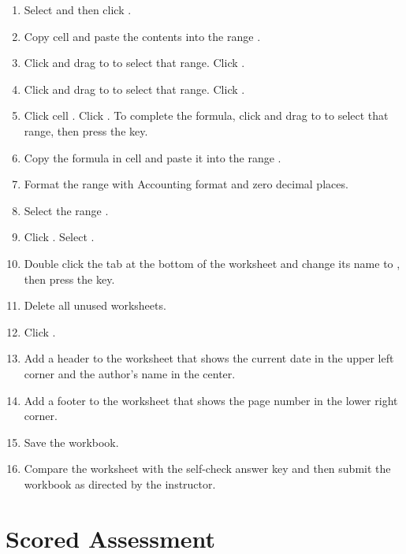\begin{enumerate}[resume]
	\item Select  and then click . 
	\item Copy cell  and paste the contents into the range .
	\item Click  and drag to  to select that range. Click .
	\item Click  and drag to  to select that range. Click .
	\item Click cell . Click . To complete the formula, click  and drag to  to select that range, then press the  key.
	\item Copy the formula in cell  and paste it into the range .
	\item Format the range  with Accounting format and zero decimal places.
	\item Select the range .
	\item Click . Select .
	\item Double click the  tab at the bottom of the worksheet and change its name to , then press the  key. 
	\item Delete all unused worksheets.
	\item Click .
	\item Add a header to the  worksheet that shows the current date in the upper left corner and the author's name in the center.
	\item Add a footer to the  worksheet that shows the page number in the lower right corner. 
	\item Save the  workbook.
	\item Compare the worksheet with the self-check answer key and then submit the  workbook as directed by the instructor.
\end{enumerate}

\section{Scored Assessment}

